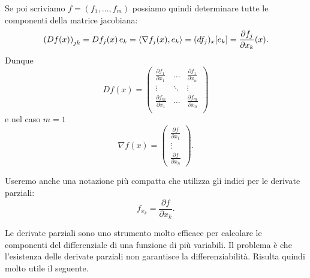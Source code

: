 Se poi scriviamo $f = (f_1,\dots,f_m)$ possiamo quindi 
determinare tutte le componenti della matrice jacobiana:
\[
  {\left( D f( x) \right)}_{jk} = D f_j( x)\,  e_k
  = \langle \nabla f_j( x), e_k\rangle
  = (d f_j)_{ x}[ e_k]
  = \frac{\partial f_j}{\partial x_k}( x).
\]
Dunque 
\[
  D f( x) = \begin{pmatrix}
    \frac{\partial f_1}{\partial x_1} & \dots & \frac{\partial f_1}{\partial x_n}\\
    \vdots & \ddots & \vdots \\
    \frac{\partial f_m}{\partial x_1} & \dots & \frac{\partial f_m}{\partial x_n}\\
  \end{pmatrix}
\]
e nel caso $m=1$ 
\[
  \nabla f ( x) = \begin{pmatrix}
    \frac{\partial f}{\partial x_1}\\
    \vdots\\
    \frac{\partial f}{\partial x_n}
  \end{pmatrix}.
\]

Useremo anche una notazione più compatta che utilizza 
gli indici per le derivate parziali:
\[
   f_{x_k} = \frac{\partial f}{\partial x_k}.
\]

Le derivate parziali sono uno strumento molto 
efficace per calcolare le componenti del differenziale 
di una funzione di più variabili.
Il problema è che l'esistenza delle derivate parziali 
non garantisce la differenziabilità.
Risulta quindi molto utile il seguente.

